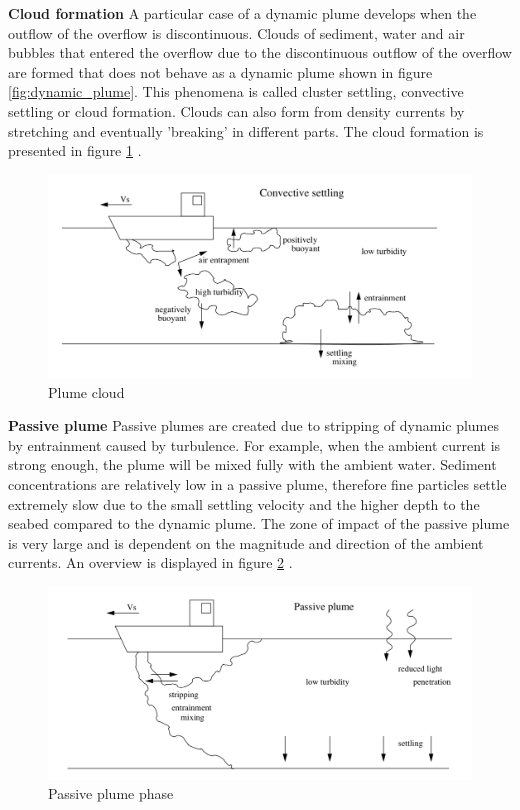\noindent \textbf{Cloud formation}\newline
A particular case of a dynamic plume develops when the outflow of the overflow is discontinuous. Clouds of sediment, water and air bubbles that entered the overflow due to the discontinuous outflow of the overflow are formed that does not behave as a dynamic plume shown in figure \ref{fig:dynamic_plume}. This phenomena is called cluster settling, convective settling or cloud formation. Clouds can also form from density currents by stretching and eventually 'breaking' in different parts. The cloud formation is presented in figure \ref{fig:cloud_plume} \citep{Dankers}.

\begin{figure}[ht!]
    \centering
    \includegraphics[width=.75\linewidth]{Images/Plume_cloud.png}
    \caption{Plume cloud }
    \label{fig:cloud_plume}
\end{figure}

\newpage
\noindent \textbf{Passive plume} \newline
\noindent
Passive plumes are created due to stripping of dynamic plumes by entrainment caused by turbulence. For example, when the ambient current is strong enough, the plume will be mixed fully with the ambient water. Sediment concentrations are relatively low in a passive plume, therefore fine particles settle extremely slow due to the small settling velocity and the higher depth to the seabed compared to the dynamic plume. The zone of impact of the passive plume is very large and is dependent on the magnitude and direction of the ambient currents. An overview is displayed in figure \ref{fig:passive_plume} \citep{Dankers}.

\begin{figure}[ht!]
    \centering
    \includegraphics[width=.75\linewidth]{Images/Plume_passive.png}
    \caption{Passive plume phase }
    \label{fig:passive_plume}
\end{figure}




